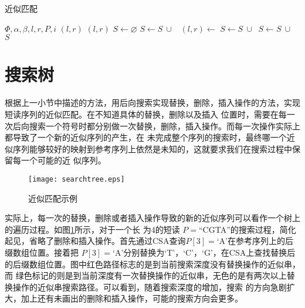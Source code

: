 \begin{algorithm}
    \caption{近似匹配}
    \label{alg:inexact}
    \begin{algorithmic}[1]
    \Require $\Phi,\alpha,\beta,l,r,P,i$
    \Ensure $(l,r)$
    \State \Return $(l,r)$
    \EndIf
    \State $S \gets \varnothing$
    \State $S \gets S\ \cup$\  
    \State $(l,r)\gets$ 
        \State $S \gets S\ \cup\ $  
        \State $S \gets S\ \cup\ $  
        \EndIf
    \EndFor
    \State \Return $S$
    \EndFunction
\end{algorithmic}
\end{algorithm}

\section{搜索树}

根据上一小节中描述的方法，用后向搜索实现替换，删除，插入操作的方法，实现短读序列的近似匹配。在不知道具体的替换，删除以及插入
位置时，需要在每一次后向搜索一个符号时都分别做一次替换，删除，插入操作。而每一次操作实际上都导致了一个新的近似序列的产生，在
未完成整个序列的搜索时，最终哪一个近似序列能够较好的映射到参考序列上依然是未知的，这就要求我们在搜索过程中保留每一个可能的近
似序列。

\begin{figure}[htbp]
    \centering
    \texttt{[image: searchtree.eps]}
    \caption{近似匹配示例} \label{fig:searchtree}
\end{figure}

实际上，每一次的替换，删除或者插入操作导致的新的近似序列可以看作一个树上的遍历过程。如图\ref{fig:searchtree}所示，对于一个长
为4的短读 $P=$``CGTA''的搜索过程，简化起见，省略了删除和插入操作。首先通过CSA查询$P[3]=$`A'在参考序列上的后缀数组位置。接着把
$P[3]=$`A'分别替换为`T'，`C'，`G'，在CSA上查找替换后的后缀数组位置。图中红色路径标志的是到当前搜索深度没有替换操作的近似串，而
绿色标记的则是到当前深度有一次替换操作的近似串，无色的是有两次以上替换操作的近似串搜索路径。可以看到，随着搜索深度的增加，搜索
的方向急剧扩大，加上还有未画出的删除和插入操作，可能的搜索方向会更多。

